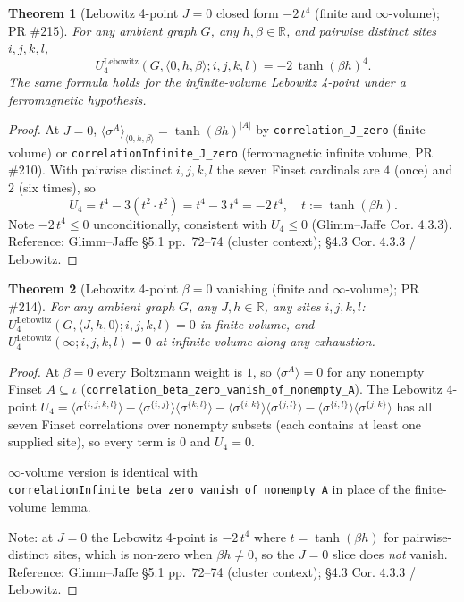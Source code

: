 \documentclass[a4paper,11pt]{article}
\newtheorem{theorem}{Theorem}
\begin{document}
\begin{theorem}[Lebowitz 4-point $J = 0$ closed form
$-2\,t^4$ (finite and $\infty$-volume); PR \#215]
For any ambient graph $G$, any $h, \beta \in \mathbb{R}$, and
pairwise distinct sites $i, j, k, l$,
\[
  U_4^{\text{Lebowitz}}(G, \langle 0,h,\beta\rangle; i,j,k,l)
  = -2\,\tanh(\beta h)^4.
\]
The same formula holds for the infinite-volume Lebowitz 4-point
under a ferromagnetic hypothesis.
\end{theorem}

\begin{proof}
At $J = 0$,
$\langle\sigma^A\rangle_{\langle 0,h,\beta\rangle}
= \tanh(\beta h)^{|A|}$
by \texttt{correlation\_J\_zero} (finite volume) or
\texttt{correlationInfinite\_J\_zero} (ferromagnetic
infinite volume, PR \#210). With pairwise distinct
$i, j, k, l$ the seven Finset cardinals are
$4$ (once) and $2$ (six times), so
\[
  U_4 = t^4 - 3(t^2 \cdot t^2) = t^4 - 3\,t^4 = -2\,t^4,
  \quad t := \tanh(\beta h).
\]
Note $-2\,t^4 \le 0$ unconditionally, consistent with
$U_4 \le 0$ (Glimm--Jaffe Cor. 4.3.3).
Reference: Glimm--Jaffe \cite{glimm-jaffe} \S 5.1 pp.~72--74
(cluster context); \S 4.3 Cor. 4.3.3 / Lebowitz.
\end{proof}

\begin{theorem}[Lebowitz 4-point $\beta = 0$ vanishing (finite and
$\infty$-volume); PR \#214]
For any ambient graph $G$, any $J, h \in \mathbb{R}$, any sites
$i, j, k, l$:
$U_4^{\text{Lebowitz}}(G, \langle J,h,0\rangle; i,j,k,l) = 0$
in finite volume, and
$U_4^{\text{Lebowitz}}(\infty; i,j,k,l) = 0$ at infinite volume
along any exhaustion.
\end{theorem}

\begin{proof}
At $\beta = 0$ every Boltzmann weight is $1$, so
$\langle \sigma^A \rangle = 0$ for any nonempty Finset
$A \subseteq \iota$
(\texttt{correlation\_beta\_zero\_vanish\_of\_nonempty\_A}). The
Lebowitz 4-point
$U_4 = \langle \sigma^{\{i,j,k,l\}}\rangle
- \langle\sigma^{\{i,j\}}\rangle\langle\sigma^{\{k,l\}}\rangle
- \langle\sigma^{\{i,k\}}\rangle\langle\sigma^{\{j,l\}}\rangle
- \langle\sigma^{\{i,l\}}\rangle\langle\sigma^{\{j,k\}}\rangle$
has all seven Finset correlations over nonempty subsets (each
contains at least one supplied site), so every term is $0$ and
$U_4 = 0$.

$\infty$-volume version is identical with
\texttt{correlationInfinite\_beta\_zero\_vanish\_of\_nonempty\_A}
in place of the finite-volume lemma.

Note: at $J = 0$ the Lebowitz 4-point is $-2\,t^4$ where
$t = \tanh(\beta h)$ for pairwise-distinct sites, which is
non-zero when $\beta h \neq 0$, so the $J = 0$ slice does
\emph{not} vanish.
Reference: Glimm--Jaffe \cite{glimm-jaffe} \S 5.1 pp.~72--74
(cluster context); \S 4.3 Cor. 4.3.3 / Lebowitz.
\end{proof}
\end{document}
